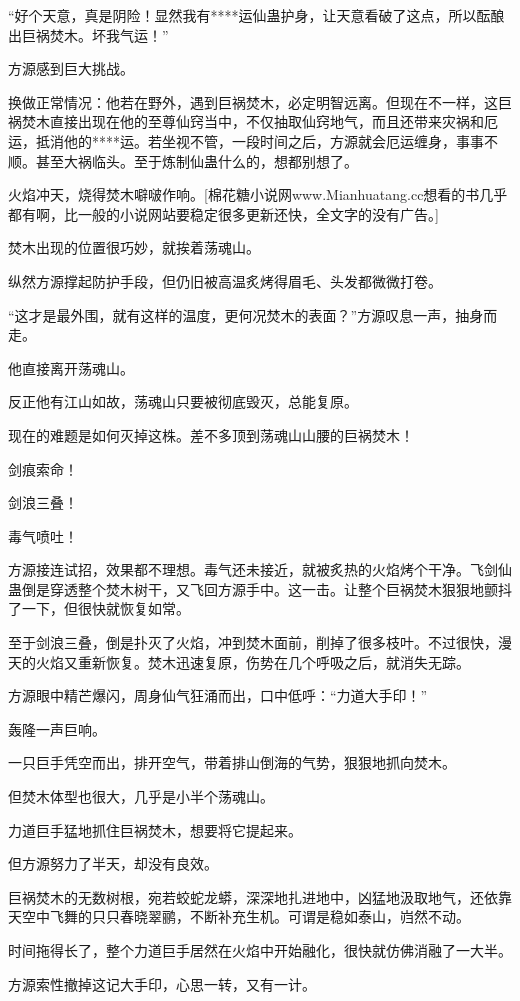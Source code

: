 \begin{this_body}
“好个天意，真是阴险！显然我有****运仙蛊护身，让天意看破了这点，所以酝酿出巨祸焚木。坏我气运！”

方源感到巨大挑战。

换做正常情况：他若在野外，遇到巨祸焚木，必定明智远离。但现在不一样，这巨祸焚木直接出现在他的至尊仙窍当中，不仅抽取仙窍地气，而且还带来灾祸和厄运，抵消他的****运。若坐视不管，一段时间之后，方源就会厄运缠身，事事不顺。甚至大祸临头。至于炼制仙蛊什么的，想都别想了。

火焰冲天，烧得焚木噼啵作响。[棉花糖小说网www.Mianhuatang.cc想看的书几乎都有啊，比一般的小说网站要稳定很多更新还快，全文字的没有广告。]

焚木出现的位置很巧妙，就挨着荡魂山。

纵然方源撑起防护手段，但仍旧被高温炙烤得眉毛、头发都微微打卷。

“这才是最外围，就有这样的温度，更何况焚木的表面？”方源叹息一声，抽身而走。

他直接离开荡魂山。

反正他有江山如故，荡魂山只要被彻底毁灭，总能复原。

现在的难题是如何灭掉这株。差不多顶到荡魂山山腰的巨祸焚木！

剑痕索命！

剑浪三叠！

毒气喷吐！

方源接连试招，效果都不理想。毒气还未接近，就被炙热的火焰烤个干净。飞剑仙蛊倒是穿透整个焚木树干，又飞回方源手中。这一击。让整个巨祸焚木狠狠地颤抖了一下，但很快就恢复如常。

至于剑浪三叠，倒是扑灭了火焰，冲到焚木面前，削掉了很多枝叶。不过很快，漫天的火焰又重新恢复。焚木迅速复原，伤势在几个呼吸之后，就消失无踪。

方源眼中精芒爆闪，周身仙气狂涌而出，口中低呼：“力道大手印！”

轰隆一声巨响。

一只巨手凭空而出，排开空气，带着排山倒海的气势，狠狠地抓向焚木。

但焚木体型也很大，几乎是小半个荡魂山。

力道巨手猛地抓住巨祸焚木，想要将它提起来。

但方源努力了半天，却没有良效。

巨祸焚木的无数树根，宛若蛟蛇龙蟒，深深地扎进地中，凶猛地汲取地气，还依靠天空中飞舞的只只春晓翠鹂，不断补充生机。可谓是稳如泰山，岿然不动。

时间拖得长了，整个力道巨手居然在火焰中开始融化，很快就仿佛消融了一大半。

方源索性撤掉这记大手印，心思一转，又有一计。


\end{this_body}
